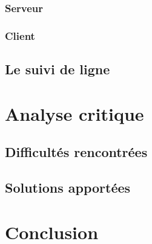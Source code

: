 \documentclass[french,a4paper,12pt]{report}
\begin{document}
\section{Serveur}%

\section{Client}%

\chapter{Le suivi de ligne} %

\part{Analyse critique}

\chapter{Difficultés rencontrées}

\chapter{Solutions apportées}

\part{Conclusion}
\end{document}
